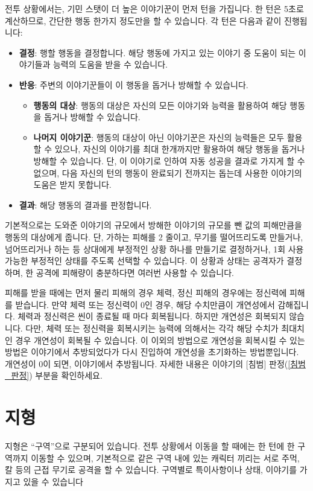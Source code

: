 \documentclass{report}
\begin{document}
	전투 상황에서는, 기민 스탯이 더 높은 이야기꾼이 먼저 턴을 가집니다. 한 턴은 5초로 계산하므로, 간단한 행동 한가지 정도만을 할 수 있습니다. 각 턴은 다음과 같이 진행됩니다:
	\begin{itemize}
		\item \textbf{결정}: 행할 행동을 결정합니다. 해당 행동에 가지고 있는 이야기 중 도움이 되는 이야기들과 능력의 도움을 받을 수 있습니다.
		\item \textbf{반응}: 주변의 이야기꾼들이 이 행동을 돕거나 방해할 수 있습니다.
		\begin{itemize}
			\item \textbf{행동의 대상}: 행동의 대상은 자신의 모든 이야기와 능력을 활용하여 해당 행동을 돕거나 방해할 수 있습니다.
			\item \textbf{나머지 이야기꾼}: 행동의 대상이 아닌 이야기꾼은 자신의 능력들은 모두 활용할 수 있으나, 자신의 이야기를 최대 한개까지만 활용하여 해당 행동을 돕거나 방해할 수 있습니다. 단, 이 이야기로 인하여 자동 성공을 결과로 가지게 할 수 없으며, 다음 자신의 턴의 행동이 완료되기 전까지는 돕는데 사용한 이야기의 도움은 받지 못합니다.
		\end{itemize}
		\item \textbf{결과}: 해당 행동의 결과를 판정합니다.
	\end{itemize}
	기본적으로는 도와준 이야기의 규모에서 방해한 이야기의 규모를 뺀 값의 피해만큼을 행동의 대상에게 줍니다. 단, 가하는 피해를 2 줄이고, 무기를 떨어뜨리도록 만들거나, 넘어뜨리거나 하는 등 상대에게 부정적인 상황 하나를 만들기로 결정하거나, 1회 사용 가능한 부정적인 상태를 주도록 선택할 수 있습니다. 이 상황과 상태는 공격자가 결정하며, 한 공격에 피해량이 충분하다면 여러번 사용할 수 있습니다.
	
	피해를 받을 때에는 먼저 물리 피해의 경우 체력, 정신 피해의 경우에는 정신력에 피해를 받습니다. 만약 체력 또는 정신력이 0인 경우, 해당 수치만큼이 개연성에서 감해집니다.
	체력과 정신력은 씬이 종료될 때 마다 회복됩니다. 하지만 개연성은 회복되지 않습니다. 다만, 체력 또는 정신력을 회복시키는 능력에 의해서는 각각 해당 수치가 최대치인 경우 개연성이 회복될 수 있습니다. 이 이외의 방법으로 개연성을 회복시킬 수 있는 방법은 이야기에서 추방되었다가 다시 진입하여 개연성을 초기화하는 방법뿐입니다.
	개연성이 0이 되면, 이야기에서 추방됩니다. 자세한 내용은 이야기의 [침범] 판정(\ref{침범_판정}) 부분을 확인하세요.
	
	\section*{지형}
	지형은 “구역”으로 구분되어 있습니다. 전투 상황에서 이동을 할 때에는 한 턴에 한 구역까지 이동할 수 있으며, 기본적으로 같은 구역 내에 있는 캐릭터 끼리는 서로 주먹, 칼 등의 근접 무기로 공격을 할 수 있습니다. 구역별로 특이사항이나 상태, 이야기를 가지고 있을 수 있습니다
	
\end{document}
